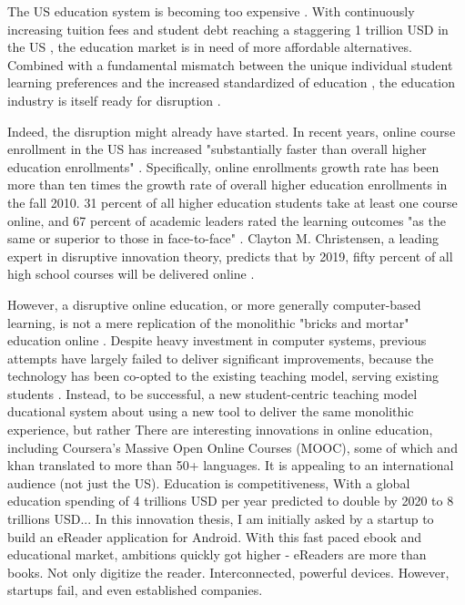 \documentclass[a4paper,10pt]{book}
\begin{document}
The US education system is becoming too expensive \cite{theInnovativeUniversity}. 
With continuously increasing tuition fees \cite{risingTuitionFees}\cite{theInnovativeUniversity} and student debt 
reaching a staggering 1 trillion USD in the US \cite{oneTrillionUsStudentDebt}, the education market is in need of 
more affordable alternatives. Combined with a fundamental mismatch between the unique individual student learning 
preferences and the increased standardized of education \cite{DisruptingClassExpandedEdition}\cite{educationInnovationNecessaryForEconomicGrowth}, 
the education industry is itself ready for disruption \cite{DisruptingClassExpandedEdition}\cite{theInnovativeUniversity}.

Indeed, the disruption might already have started. In recent years, online course enrollment in the US has increased 
"substantially faster than overall higher education enrollments" \cite{babsonOnlineEduGrowth2011}. Specifically, online 
enrollments growth rate has been more than ten times the growth rate of overall higher education enrollments in the fall 2010. 
31 percent of all higher education 
students take at least  one course online, and 67 percent of academic leaders rated the learning outcomes 
"as the same or superior to those in face-to-face" \cite{babsonOnlineEduGrowth2011}. 
Clayton M. Christensen, a leading expert in disruptive innovation theory, predicts that by 2019,
fifty percent of all high school courses will be delivered online \cite{DisruptingClassExpandedEdition}.

However, a disruptive online education, or more generally computer-based learning, is not a mere replication of the monolithic 
"bricks and mortar" education online \cite{DisruptingClassExpandedEdition}. Despite heavy investment in computer systems, previous attempts have 
largely failed to deliver significant improvements, because the technology has been co-opted to the existing teaching model, serving 
existing students \cite{DisruptingClassExpandedEdition}. 
Instead, to be successful, a new student-centric teaching model ducational system 
about using a new tool to deliver the same monolithic experience, 
but rather
There are interesting innovations in online education, including Coursera's Massive Open Online Courses (MOOC), some of which 
and khan translated to more than 50+ languages. It is appealing to an international audience (not just the US).
Education is competitiveness, 
With a global education spending of 4 trillions USD per year predicted to double by 2020 to 8 trillions USD...
In this innovation thesis, I am initially asked by a startup to build an eReader application for Android. With this fast paced ebook and educational market,
ambitions quickly got higher - eReaders are more than books. Not only digitize the reader. Interconnected, powerful devices.
However, startups fail, and even established companies.
\end{document}
